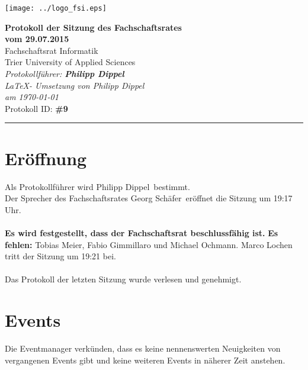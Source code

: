 \documentclass[a4paper, 11pt]{article} %
\newcommand{\protokoller}{Philipp Dippel}
\newcommand{\dateOfMeeting}{29.07.2015}
\newcommand{\TeXer}{Philipp Dippel}
\newcommand{\fsiPresident}{Georg Schäfer}
\newcommand{\protocolID}{9}
\begin{document}

\doublespacing
\thispagestyle{empty}

\begin{center}
\texttt{[image: ../logo\_fsi.eps]}

\vspace*{\fill}
{\LARGE \textbf{Protokoll der Sitzung des Fachschaftsrates \\vom \dateOfMeeting}}\\
Fachschaftsrat Informatik\\
Trier University of Applied Sciences\\
\vspace{2.5cm}
\textit{
	Protokollführer: \textbf{\protokoller} \\
	\LaTeX - Umsetzung von \TeXer\\
	am \today\\
}
Protokoll ID: \textbf{\#\protocolID}
\vfill
\end{center}

\hspace*{-35cm}
\textcolor{fsi}{\rule{64.9cm}{15pt}}
\pagebreak

\setcounter{tocdepth}{2}
\tableofcontents
\pagebreak

\section{Eröffnung}
Als Protokollführer wird \protokoller~bestimmt.\\
Der Sprecher des Fachschaftsrates \fsiPresident~eröffnet die Sitzung um 19:17 Uhr.
\\\\
\textbf{Es wird festgestellt, dass der Fachschaftsrat beschlussfähig ist.}
\textbf{Es fehlen:} Tobias Meier, Fabio Gimmillaro und Michael Ochmann.
Marco Lochen tritt der Sitzung um 19:21 bei.
\\\\
Das Protokoll der letzten Sitzung wurde verlesen und genehmigt.

\section{Events}
Die Eventmanager verkünden, dass es keine nennenswerten Neuigkeiten von vergangenen Events gibt und keine weiteren Events in näherer Zeit anstehen.
\end{document}
